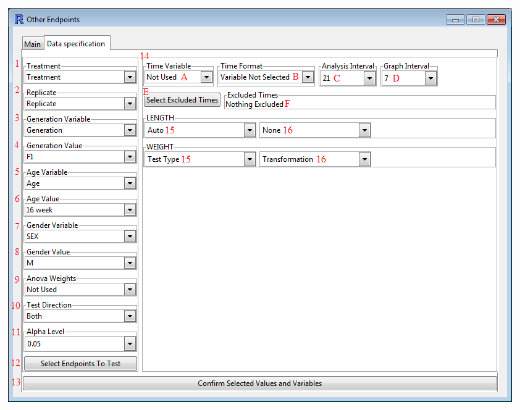 \documentclass[a4paper]{article}
\begin{document}
\hypertarget{fig:DataSpecTab}{} 
\begin{center}
\includegraphics[width=\textwidth,keepaspectratio]{StandardAnl3.png}
\end{center} 
\end{document}
